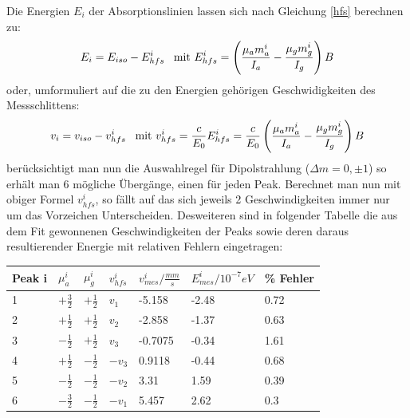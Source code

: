 \documentclass[12pt]{article}
\begin{document}
Die Energien $E_i$ der Absorptionslinien lassen sich nach Gleichung \ref{hfs} berechnen zu:
\begin{align*}
 E_i = E_{iso} - E_{hfs}^i \hspace{5pt} \textnormal{    mit } E_{hfs}^i = \left( \frac{\mu_a m_a^i}{I_a} - \frac{\mu_g m_g^i}{I_g} \right) B
\end{align*}
oder, umformuliert auf die zu den Energien gehörigen Geschwidigkeiten des Messschlittens:
\begin{align*}
 v_i = v_{iso} - v_{hfs}^i \hspace{5pt} \textnormal{    mit } v_{hfs}^i = \frac{c}{E_0} E_{hfs}^i = \frac{c}{E_0} \left( \frac{\mu_a m_a^i}{I_a} - \frac{\mu_g m_g^i}{I_g} \right) B
\end{align*}
\label{geschw}
berücksichtigt man nun die Auswahlregel für Dipolstrahlung ($\Delta m = 0, \pm 1$) so erhält man 6 mögliche Übergänge, einen für jeden Peak. Berechnet man 
nun mit obiger Formel $v_{hfs}^i$, so fällt auf das sich jeweils 2 Geschwindigkeiten immer nur um das Vorzeichen Unterscheiden.
Desweiteren sind in folgender Tabelle die aus dem Fit gewonnenen Geschwindigkeiten der Peaks sowie deren daraus resultierender Energie mit relativen Fehlern
eingetragen:
\begin{center}
\begin{tabular}{|l|llllll|}
\hline
Peak i & $\mu_a^i$ & $\mu_g^i$ & $v_{hfs}^i$ & $v_{mes}^i/\frac{mm}{s}$ & $E_{mes}^i/10^{-7} eV$ & \% Fehler\\
\hline
1 & $+\frac{3}{2}$ & $+\frac{1}{2}$ & $v_1$ & -5.158 & -2.48 & 0.72\\
2 & $+\frac{1}{2}$ & $+\frac{1}{2}$ & $v_2$ & -2.858 & -1.37 & 0.63\\
3 & $-\frac{1}{2}$ & $+\frac{1}{2}$ & $v_3$ & -0.7075 & -0.34 & 1.61\\
4 & $+\frac{1}{2}$ & $-\frac{1}{2}$ & $-v_3$ & 0.9118 & -0.44 & 0.68\\
5 & $-\frac{1}{2}$ & $-\frac{1}{2}$ & $-v_2$ & 3.31 & 1.59 & 0.39\\
6 & $-\frac{3}{2}$ & $-\frac{1}{2}$ & $-v_1$ & 5.457 & 2.62 & 0.3\\
\hline
\end{tabular}
\label{eisen_tab1}
\end{center}
\end{document}
